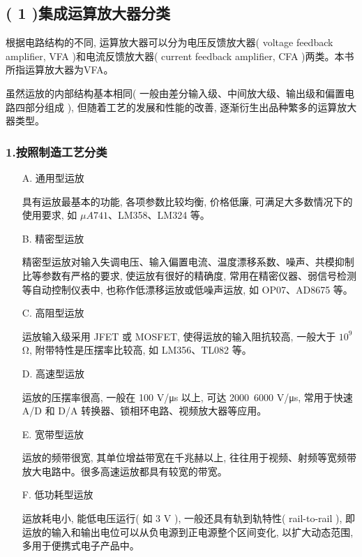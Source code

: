 \documentclass[10pt, a4paper]{article} %
\begin{document}
\subsection*{( 1 )集成运算放大器分类}

根据电路结构的不同, 运算放大器可以分为电压反馈放大器( voltage feedback amplifier, VFA )和电流反馈放大器( current feedback amplifier, CFA )两类。本书所指运算放大器为VFA。

虽然运放的内部结构基本相同( 一般由差分输入级、中间放大级、输出级和偏置电路四部分组成 ), 但随着工艺的发展和性能的改善, 逐渐衍生出品种繁多的运算放大器类型。

\subsubsection*{1.按照制造工艺分类}

\begin{enumerate}
    \item[A.] 通用型运放
    
    具有运放最基本的功能, 各项参数比较均衡, 价格低廉, 可满足大多数情况下的使用要求, 如 $\mu A741$、LM358、LM324 等。
    
    \item[B.] 精密型运放
    
    精密型运放对输入失调电压、输入偏置电流、温度漂移系数、噪声、共模抑制比等参数有严格的要求, 使运放有很好的精确度, 常用在精密仪器、弱信号检测等自动控制仪表中, 也称作低漂移运放或低噪声运放, 如 OP07、AD8675 等。
    
    \item[C.] 高阻型运放
    
    运放输入级采用 JFET 或 MOSFET, 使得运放的输入阻抗较高, 一般大于 $10^9$ Ω, 附带特性是压摆率比较高, 如 LM356、TL082 等。
    
    \item[D.] 高速型运放
    
    运放的压摆率很高, 一般在 100 V/μs 以上, 可达 2000~6000 V/μs, 常用于快速 A/D 和 D/A 转换器、锁相环电路、视频放大器等应用。
    
    \item[E.] 宽带型运放
    
    运放的频带很宽, 其单位增益带宽在千兆赫以上, 往往用于视频、射频等宽频带放大电路中。很多高速运放都具有较宽的带宽。
    
    \item[F.] 低功耗型运放
    
    运放耗电小, 能低电压运行( 如 3 V ), 一般还具有轨到轨特性( rail-to-rail ), 即运放的输入和输出电位可以从负电源到正电源整个区间变化, 以扩大动态范围, 多用于便携式电子产品中。
\end{enumerate}
\end{document}
